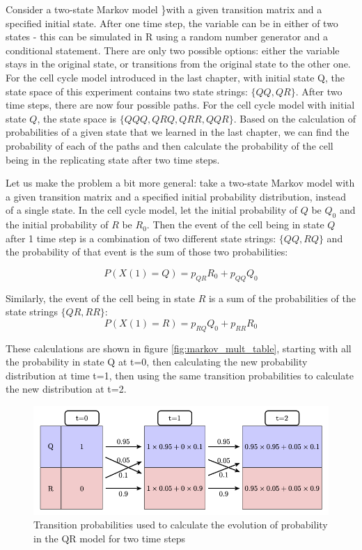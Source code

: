 \documentclass[
]{book}
\theoremstyle{definition}
\theoremstyle{definition}
\theoremstyle{definition}
\theoremstyle{remark}
\begin{document}
\label{sec:math11}

Consider a two-state Markov model \}with a given transition matrix and a specified initial state. After one time step, the variable can be in either of two states - this can be simulated in R using a random number generator and a conditional statement. There are only two possible options: either the variable stays in the original state, or transitions from the original state to the other one. For the cell cycle model introduced in the last chapter, with initial state Q, the state space of this experiment contains two state strings: \(\{QQ, QR\}\). After two time steps, there are now four possible paths. For the cell cycle model with initial state \(Q\), the state space is \(\{QQQ, QRQ, QRR, QQR\}\). Based on the calculation of probabilities of a given state that we learned in the last chapter, we can find the probability of each of the paths and then calculate the probability of the cell being in the replicating state after two time steps.

Let us make the problem a bit more general: take a two-state Markov model with a given transition matrix and a specified initial probability distribution, instead of a single state. In the cell cycle model, let the initial probability of \(Q\) be \(Q_0\) and the initial probability of \(R\) be \(R_0\). Then the event of the cell being in state \(Q\) after 1 time step is a combination of two different state strings: \(\{QQ, RQ\}\) and the probability of that event is the sum of those two probabilities:

\[ 
P(X(1) = Q)  = p_{QR}R_0 + p_{QQ}Q_0  
\]

Similarly, the event of the cell being in state \(R\) is a sum of the probabilities of the state strings \(\{QR, RR\}\):
\[ 
P(X(1) = R) = p_{RQ}Q_0 + p_{RR}R_0 
\]

These calculations are shown in figure \ref{fig:markov_mult_table}, starting with all the probability in state Q at t=0, then calculating the new probability distribution at time t=1, then using the same transition probabilities to calculate the new distribution at t=2.

\begin{figure}
\centering
\includegraphics{ch11/markov_table.png}
\caption{Transition probabilities used to calculate the evolution of probability in the QR model for two time steps}
\end{figure}
\end{document}
